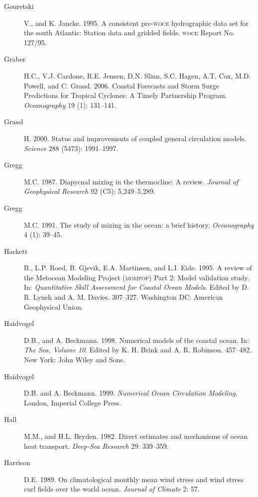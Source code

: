 \begin{description}
\item [Gouretski]V., and K. Jancke. 1995. A consistent
  pre-\textsc{woce} hydrographic data set for the south Atlantic:
  Station data and gridded fields.  \textsc{woce} Report No. 127/95.

\item [Graber]H.C., V.J. Cardone, R.E. Jensen, D.N. Slinn, S.C. Hagen,
  A.T. Cox, M.D. Powell, and C. Grassl. 2006. Coastal Forecasts and
  Storm Surge Predictions for Tropical Cyclones: A Timely Partnership
  Program. \textit{Oceanography} 19 (1): 131--141.
	
\item [Grassl]H. 2000. Status and improvements of coupled general
  circulation models. \textit{Science} 288 (5473): 1991--1997.

\item[Gregg]M.C. 1987. Diapycnal mixing in the thermocline: A review.
  \textit{Journal of Geophysical Research} 92 (C5): 5,249--5,289.

\item [Gregg]M.C. 1991. The study of mixing in the ocean: a brief
  history.  \textit{Oceanography} 4 (1): 39--45.

\item [Hackett]B., L.P. Roed, B. Gjevik, E.A. Martinsen, and
  L.I. Eide. 1995. A review of the Metocean Modeling Project
  (\textsc{mompop}) Part 2: Model validation study. In:
  \textit{Quantitative Skill Assessment for Coastal Ocean
    Models}. Edited by D. R. Lynch and
  A. M. Davies. 307--327. Washington DC: American Geophysical Union.

\item [Haidvogel]D.B., and A. Beckmann. 1998. Numerical models of the
  coastal ocean. In: \textit{The Sea, Volume 10}. Edited by
  K. H. Brink and A. R. Robinson. 457--482. New York: John Wiley and
  Sons.

\item [Haidvogel]D.B. and A. Beckmann. 1999. \textit{Numerical Ocean
  Circulation Modeling}. London, Imperial College Press.

\item [Hall]M.M., and H.L. Bryden. 1982. Direct estimates and
  mechanisms of ocean heat transport. \textit{Deep-Sea Research} 29:
  339--359.

\item [Harrison]D.E. 1989. On climatological monthly mean wind stress
  and wind stress curl fields over the world ocean. \textit{Journal of
    Climate} 2: 57.


\end{description}
